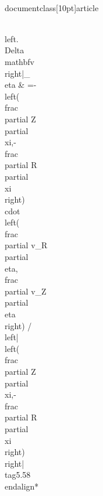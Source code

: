 \\documentclass[10pt]{article}
\begin{document}
{\\left.\\Delta \\mathbf{v}\\right|_{\\eta} & =-\\left(\\frac{\\partial Z}{\\partial \\xi},-\\frac{\\partial R}{\\partial \\xi}\\right) \\cdot\\left(\\frac{\\partial v_{R}}{\\partial \\eta}, \\frac{\\partial v_{Z}}{\\partial \\eta}\\right) /\\left|\\left(\\frac{\\partial Z}{\\partial \\xi},-\\frac{\\partial R}{\\partial \\xi}\\right)\\right| \\tag{5.58}
\\end{align*}


}
\end{document}
